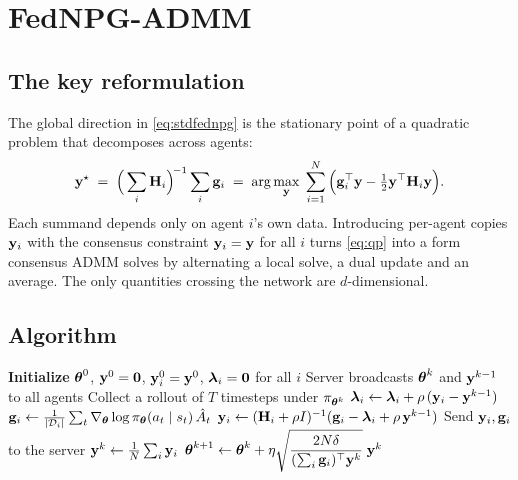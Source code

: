 \section{FedNPG-ADMM}
\label{sec:method}

\subsection{The key reformulation}

The global direction in \eqref{eq:stdfednpg} is the stationary point of a
quadratic problem that decomposes across agents:
\begin{equation}
  \mathbf{y}^{\star}
  \;=\;\Big(\sum_i \mathbf{H}_i\Big)^{\!-1}\sum_i \mathbf{g}_i
  \;=\;\arg\max_{\mathbf{y}}\;
  \sum_{i=1}^{N}\Big(\mathbf{g}_i^{\top}\mathbf{y} - \tfrac{1}{2}\mathbf{y}^{\top}\mathbf{H}_i\mathbf{y}\Big).
  \label{eq:qp}
\end{equation}
Each summand depends only on agent $i$'s own data. Introducing per-agent
copies $\mathbf{y}_i$ with the consensus constraint $\mathbf{y}_i = \mathbf{y}$ for all $i$ turns
\eqref{eq:qp} into a form consensus ADMM solves by alternating a local solve, a
dual update and an average. The only quantities crossing the network are
$d$-dimensional.

\subsection{Algorithm}

\begin{algorithm}[t]
\caption{FedNPG-ADMM (Algorithm 1 of \citealp{lan2023fednpgadmm})}
\label{alg:fednpgadmm}
\begin{algorithmic}[1]
  \State \textbf{Initialize} $\boldsymbol{\theta}^0$, $\mathbf{y}^0 = \mathbf{0}$,
         $\mathbf{y}_i^0 = \mathbf{y}^0$, $\boldsymbol{\lambda}_i = \mathbf{0}$ for all $i$
    \State Server broadcasts $\boldsymbol{\theta}^k$ and $\mathbf{y}^{k-1}$ to all agents
      \State Collect a rollout of $T$ timesteps under $\pi_{\boldsymbol{\theta}^k}$
      \State $\boldsymbol{\lambda}_i \leftarrow \boldsymbol{\lambda}_i + \rho\,(\mathbf{y}_i - \mathbf{y}^{k-1})$
      \State $\mathbf{g}_i \leftarrow \frac{1}{|\mathcal{D}_i|}\sum_{t}
             \nabla_{\boldsymbol{\theta}}\log\pi_{\boldsymbol{\theta}}(a_t \mid s_t)\,\hat{A}_t$
      \State $\mathbf{y}_i \leftarrow (\mathbf{H}_i + \rho I)^{-1}
             (\mathbf{g}_i - \boldsymbol{\lambda}_i + \rho\,\mathbf{y}^{k-1})$
      \State Send $\mathbf{y}_i, \mathbf{g}_i$ to the server
    \EndFor
    \State $\mathbf{y}^{k} \leftarrow \frac{1}{N}\sum_{i} \mathbf{y}_i$
    \State $\boldsymbol{\theta}^{k+1} \leftarrow \boldsymbol{\theta}^{k} +
           \eta\sqrt{\dfrac{2N\delta}{(\sum_i \mathbf{g}_i)^{\top}\mathbf{y}^{k}}}\;\mathbf{y}^{k}$
  \EndFor
\end{algorithmic}
\end{algorithm}

